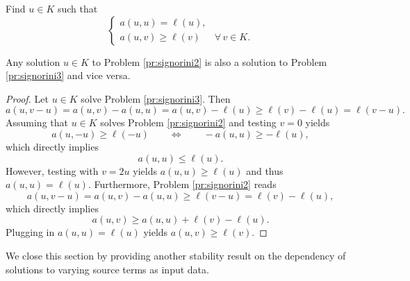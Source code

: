 \begin{problem}\label{pr:signorini3}
Find $u\in K$ such that
\begin{equation*}
	\begin{cases}
		a(u,u) = \ell(u), &                   \\[2pt]
		a(u,v)\ge \ell(v) & \forall\, v\in K.
	\end{cases}
\end{equation*}
\end{problem}

\begin{proposition}\label{pr:equivalence23} Any solution $u\in K$ to Problem \ref{pr:signorini2} is also a solution to Problem \ref{pr:signorini3} and vice versa.
\end{proposition}
\begin{proof}
	Let $u\in K$ solve Problem \ref{pr:signorini3}. Then
	\begin{equation*}
		a(u,v-u) = a(u,v)-a(u,u)  = a(u,v)-\ell(u)\ge \ell(v)-\ell(u) = \ell(v-u).
	\end{equation*}
	Assuming that $u\in K$ solves Problem \ref{pr:signorini2} and testing $v=0$ yields
	\begin{equation*}
		a(u,-u)\ge \ell(-u)\qquad\Longleftrightarrow\qquad -a(u,u)\ge -\ell(u),
	\end{equation*}
	which directly implies
	\begin{equation*}
		a(u,u)\le \ell(u).
	\end{equation*}
	However, testing with $v=2u$ yields $a(u,u)\ge \ell(u)$ and thus $a(u,u) = \ell(u)$. Furthermore, Problem \ref{pr:signorini2} reads
	\begin{equation*}
		a(u,v-u) = a(u,v)-a(u,u)\ge \ell(v-u) = \ell(v)-\ell(u),
	\end{equation*}
	which directly implies
	\begin{equation*}
		a(u,v)\ge a(u,u)+\ell(v)-\ell(u).
	\end{equation*}
	Plugging in $a(u,u) = \ell(u)$ yields $a(u,v)\ge \ell(v)$.
\end{proof}


We close this section by providing another stability result on the dependency of solutions to varying source terms as input data.

